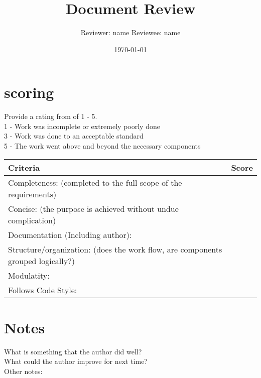 \documentclass{article}
\title{Document Review}
\author{Reviewer: name Reviewee: name }
\date{\today}
\begin{document}
\maketitle

\section{scoring}
    Provide a rating from of 1 - 5. \\
    1 - Work was incomplete or extremely poorly done\\
    3 - Work was done to an acceptable standard\\
    5 - The work went above and beyond the necessary components\\

\begin{tabular}{|l|c|}
	\hline
	Criteria & Score\\
	\hline
    Completeness:
    (completed to the full scope of the requirements) & \\
	\hline
    Concise:
    (the purpose is achieved without undue complication) & \\
	\hline
    Documentation (Including author): & \\
    \hline
    Structure/organization:
    (does the work flow, are components grouped logically?) & \\
    \hline
    Modulatity: & \\
    \hline
    Follows Code Style: & \\
    \hline
\end{tabular}

\section{Notes}
    
    What is something that the author did well?\\
    
    What could the author improve for next time?\\
    
    Other notes:\\
\end{document}
